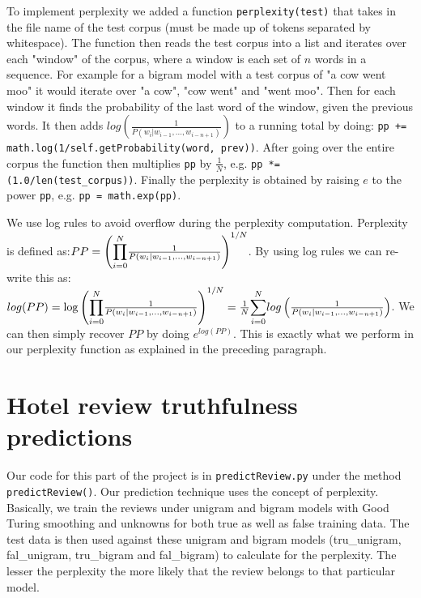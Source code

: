 \documentclass{article}
\begin{document}
To implement perplexity we added a function \texttt{perplexity(test)} that takes in the file name of the test corpus (must be made up of tokens separated by whitespace). The function then reads the test corpus into a list and iterates over each "window" of the corpus, where a window is each set of $n$ words in a sequence. For example for a bigram model with a test corpus of "a cow went moo" it would iterate over "a cow", "cow went" and "went moo". Then for each window it finds the probability of the last word of the window, given the previous words. It then adds $log\left(\frac{1}{P(w_i|w_{i-1},...,w_{i-n+1})}\right)$ to a running total by doing: \texttt{pp += math.log(1/self.getProbability(word, prev))}. After going over the entire corpus the function then multiplies \texttt{pp} by $\frac{1}{N}$, e.g. \texttt{pp *= (1.0/len(test\_corpus))}. Finally the perplexity is obtained by raising $e$ to the power \texttt{pp}, e.g. \texttt{pp = math.exp(pp)}.

We use log rules to avoid overflow during the perplexity computation. Perplexity is defined as:\linebreak $PP=\left(\mathlarger{\prod}_{i=0}^N\frac{1}{P(w_i|w_{i-1},...,w_{i-n+1})}\right)^{1/N}$. By using log rules we can re-write this as: \linebreak $log(PP) = \log\left(\mathlarger{\prod}_{i=0}^N\frac{1}{P(w_i|w_{i-1},...,w_{i-n+1})}\right)^{1/N} = \frac{1}{N}\mathlarger{\sum}_{i=0}^N log\left(\frac{1}{P(w_i|w_{i-1},...,w_{i-n+1})}\right)$. We can then simply recover $PP$ by doing $e^{log(PP)}$. This is exactly what we perform in our perplexity function as explained in the preceding paragraph.

\section{Hotel review truthfulness predictions} %
Our code for this part of the project is in \texttt{predictReview.py} under the method \texttt{predictReview()}. Our prediction technique uses the concept of perplexity. Basically, we train the reviews under unigram and bigram models with Good Turing smoothing and unknowns for both true as well as false training data. The test data is then used against these unigram and bigram models (tru\_unigram, fal\_unigram, tru\_bigram and fal\_bigram) to calculate for the perplexity. The lesser the perplexity the more likely that the review belongs to that particular model. \par
\end{document}
